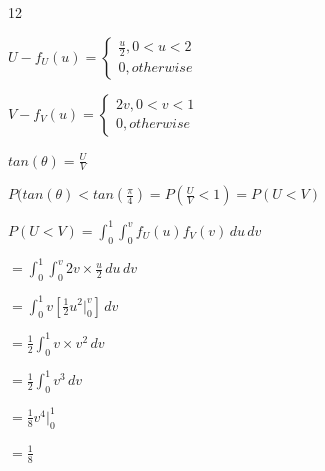 \documentclass[12 pt]{article}
\begin{document}
    \begin{exercise}{12}
    \hfill

    $U - f_U(u) = \begin{cases}
        \frac{u}{2}, 0 < u < 2 \\
        0, otherwise
    \end{cases}$

    $V- f_V(u) = \begin{cases}
        2v, 0<v<1 \\
        0, otherwise
    \end{cases}$

    \hfill

    $tan(\theta) = \frac{U}{V}$

    \hfill

    $P(tan(\theta) < tan(\frac{\pi}{4}) = P(\frac{U}{V} < 1) = P(U<V)$

    $P(U<V) = \int_{0}^{1} \int_{0}^{v} f_U(u) f_V(v) \, du \, dv$

    $= \int_{0}^{1} \int_{0}^{v} 2v \times \frac{u}{2} \, du \, dv$

    $= \int_{0}^{1} v [\frac{1}{2}u^2 |_{0}^{v}] \, dv$

    $=  \frac{1}{2} \int_{0}^{1} v \times v^2 \, dv$

    $= \frac{1}{2} \int_{0}^{1} v^3 \, dv$

    $= \frac{1}{8}v^4 |_{0}^{1}$

    $= \frac{1}{8}$
    
    \hfill    
    \end{exercise}

  
\end{document}
